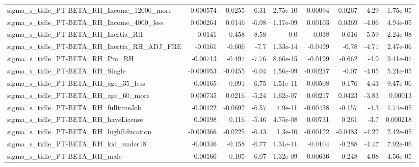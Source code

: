 \begin{tabular}{lrrrrrrrr}
sigma\_s\_tidle\_PT-BETA\_RH\_Income\_12000\_more         &   -0.000574 &      -0.0255 &    -6.31 & 2.75e-10 &   -0.00094 &     -0.0267 &        -4.29 &      1.75e-05 \\
sigma\_s\_tidle\_PT-BETA\_RH\_Income\_4000\_less          &    0.000264 &       0.0146 &    -6.08 & 1.17e-09 &    0.00103 &      0.0369 &        -4.06 &      4.94e-05 \\
sigma\_s\_tidle\_PT-BETA\_RH\_Inertia\_RH                &     -0.0141 &       -0.458 &    -8.58 &      0.0 &     -0.038 &      -0.616 &        -5.59 &      2.24e-08 \\
sigma\_s\_tidle\_PT-BETA\_RH\_Inertia\_RH\_ADJ\_FRE        &     -0.0161 &       -0.606 &     -7.7 & 1.33e-14 &    -0.0499 &       -0.78 &        -4.71 &      2.47e-06 \\
sigma\_s\_tidle\_PT-BETA\_RH\_Pro\_RH                    &    -0.00713 &       -0.497 &    -7.76 & 8.66e-15 &    -0.0199 &      -0.662 &         -4.9 &      9.41e-07 \\
sigma\_s\_tidle\_PT-BETA\_RH\_Single                    &   -0.000953 &      -0.0455 &    -6.04 & 1.56e-09 &   -0.00237 &       -0.07 &        -4.05 &      5.21e-05 \\
sigma\_s\_tidle\_PT-BETA\_RH\_age\_35\_less               &    -0.00165 &       -0.091 &    -6.75 & 1.51e-11 &   -0.00508 &      -0.176 &        -4.43 &      9.47e-06 \\
sigma\_s\_tidle\_PT-BETA\_RH\_age\_60\_more               &    0.000735 &       0.0216 &    -5.24 & 1.62e-07 &    0.00217 &      0.0423 &        -3.83 &       0.00013 \\
sigma\_s\_tidle\_PT-BETA\_RH\_fulltimeJob               &    -0.00122 &      -0.0692 &    -6.57 &  4.9e-11 &   -0.00438 &      -0.157 &         -4.3 &      1.74e-05 \\
sigma\_s\_tidle\_PT-BETA\_RH\_haveLicense               &     0.00198 &        0.116 &    -5.46 & 4.75e-08 &    0.00731 &       0.261 &         -3.7 &      0.000218 \\
sigma\_s\_tidle\_PT-BETA\_RH\_highEducation             &   -0.000366 &      -0.0225 &    -6.43 &  1.3e-10 &   -0.00122 &     -0.0483 &        -4.22 &      2.42e-05 \\
sigma\_s\_tidle\_PT-BETA\_RH\_kid\_under18               &    -0.00346 &       -0.158 &    -6.77 & 1.31e-11 &    -0.0104 &      -0.288 &        -4.47 &      7.92e-06 \\
sigma\_s\_tidle\_PT-BETA\_RH\_male                      &     0.00166 &        0.105 &    -6.07 & 1.32e-09 &    0.00636 &       0.248 &        -4.08 &      4.56e-05 \\

\end{tabular}
